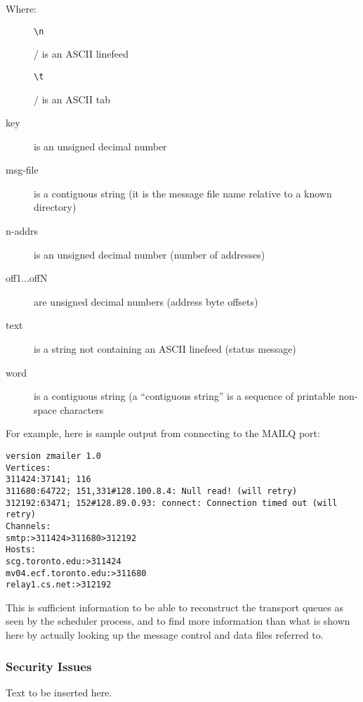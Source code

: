 Where:
\begin{description}
\item[] \mbox{}

\begin{verbatim}
\n
\end{verbatim}
/ is an ASCII linefeed

\item[] \mbox{}

\begin{verbatim}
\t
\end{verbatim}
/ is an ASCII tab

\item[key] \mbox{}

is an unsigned decimal number

\item[msg-file] \mbox{}

is a contiguous string (it is the message file name relative 
to a known directory)

\item[n-addrs] \mbox{}

is an unsigned decimal number (number of addresses)

\item[off1...offN] \mbox{}

are unsigned decimal numbers (address byte offsets)

\item[text] \mbox{}

is a string not containing an ASCII linefeed (status message)

\item[word] \mbox{}

is a contiguous string (a ``contiguous string'' is a sequence of 
printable non-space characters

\end{description}

For example, here is sample output from connecting to  the
MAILQ port:
\begin{verbatim}
version zmailer 1.0
Vertices:
311424:37141; 116
311680:64722; 151,331#128.100.8.4: Null read! (will retry)
312192:63471; 152#128.89.0.93: connect: Connection timed out (will retry)
Channels:
smtp:>311424>311680>312192
Hosts:
scg.toronto.edu:>311424
mv04.ecf.toronto.edu:>311680
relay1.cs.net:>312192
\end{verbatim}


This is sufficient information to be able to reconstruct
the transport queues as seen by the scheduler process, and
to find more information than what is shown here by 
actually  looking  up  the  message     control  and  data  files
referred to.

\subsubsection{Security Issues}

Text to be inserted here.

